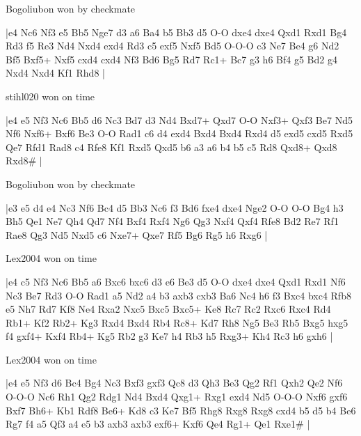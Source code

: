 \showboard

Bogoliubon won by checkmate

\makegametitle
|e4 Nc6 Nf3 e5 Bb5 Nge7 d3 a6 Ba4 b5 Bb3 d5 O-O dxe4 dxe4 Qxd1 Rxd1 Bg4 Rd3 f5 Re3 Nd4 Nxd4 exd4 Rd3 c5 exf5 Nxf5 Bd5 O-O-O c3 Ne7 Be4 g6 Nd2 Bf5 Bxf5+ Nxf5 cxd4 cxd4 Nf3 Bd6 Bg5 Rd7 Rc1+ Bc7 g3 h6 Bf4 g5 Bd2 g4 Nxd4 Nxd4 Kf1 Rhd8  |

\showboard

stihl020 won on time

\makegametitle
|e4 e5 Nf3 Nc6 Bb5 d6 Nc3 Bd7 d3 Nd4 Bxd7+ Qxd7 O-O Nxf3+ Qxf3 Be7 Nd5 Nf6 Nxf6+ Bxf6 Be3 O-O Rad1 c6 d4 exd4 Bxd4 Bxd4 Rxd4 d5 exd5 cxd5 Rxd5 Qe7 Rfd1 Rad8 c4 Rfe8 Kf1 Rxd5 Qxd5 b6 a3 a6 b4 b5 c5 Rd8 Qxd8+ Qxd8 Rxd8\#  |

\showboard

Bogoliubon won by checkmate

\makegametitle
|e3 e5 d4 e4 Nc3 Nf6 Bc4 d5 Bb3 Nc6 f3 Bd6 fxe4 dxe4 Nge2 O-O O-O Bg4 h3 Bh5 Qe1 Ne7 Qh4 Qd7 Nf4 Bxf4 Rxf4 Ng6 Qg3 Nxf4 Qxf4 Rfe8 Bd2 Re7 Rf1 Rae8 Qg3 Nd5 Nxd5 c6 Nxe7+ Qxe7 Rf5 Bg6 Rg5 h6 Rxg6  |

\showboard

Lex2004 won on time

\makegametitle
|e4 c5 Nf3 Nc6 Bb5 a6 Bxc6 bxc6 d3 e6 Be3 d5 O-O dxe4 dxe4 Qxd1 Rxd1 Nf6 Nc3 Be7 Rd3 O-O Rad1 a5 Nd2 a4 b3 axb3 cxb3 Ba6 Nc4 h6 f3 Bxc4 bxc4 Rfb8 e5 Nh7 Rd7 Kf8 Ne4 Rxa2 Nxc5 Bxc5 Bxc5+ Ke8 Rc7 Rc2 Rxc6 Rxc4 Rd4 Rb1+ Kf2 Rb2+ Kg3 Rxd4 Bxd4 Rb4 Rc8+ Kd7 Rh8 Ng5 Be3 Rb5 Bxg5 hxg5 f4 gxf4+ Kxf4 Rb4+ Kg5 Rb2 g3 Ke7 h4 Rb3 h5 Rxg3+ Kh4 Rc3 h6 gxh6  |

\showboard

Lex2004 won on time

\makegametitle
|e4 e5 Nf3 d6 Bc4 Bg4 Nc3 Bxf3 gxf3 Qc8 d3 Qh3 Be3 Qg2 Rf1 Qxh2 Qe2 Nf6 O-O-O Nc6 Rh1 Qg2 Rdg1 Nd4 Bxd4 Qxg1+ Rxg1 exd4 Nd5 O-O-O Nxf6 gxf6 Bxf7 Bh6+ Kb1 Rdf8 Be6+ Kd8 c3 Ke7 Bf5 Rhg8 Rxg8 Rxg8 cxd4 b5 d5 b4 Be6 Rg7 f4 a5 Qf3 a4 e5 b3 axb3 axb3 exf6+ Kxf6 Qe4 Rg1+ Qe1 Rxe1\#  |

\showboard

